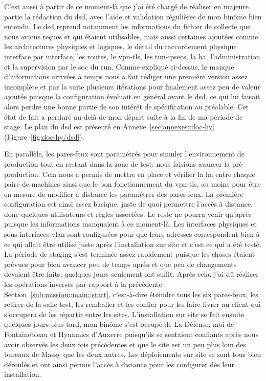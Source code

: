 \documentclass[12pt, oneside, a4paper, titlepage]{report}
\begin{document}
C'est aussi à partir de ce moment-là que j'ai été chargé de réaliser en majeure
partie la rédaction du \acrfull{dsd}, avec l'aide et validation régulières de
mon binôme bien entendu. Le \gls{dsd} reprend notamment les informations du
fichier de collecte que nous avions reçues et qui étaient utilisables, mais
aussi certaines ajoutées comme les architectures physiques et logiques, le
détail du raccordement physique interface par interface, les routes, le
\gls{vpn-tls}, les \glspl{tun-ipsec}, la \acrfull{ha}, l'administration et la
supervision par le \gls{soc} du \gls{run}. Comme expliqué ci-dessus, le manque
d'informations arrivées à temps nous a fait rédiger une première version assez
incomplète et par la suite plusieurs itérations pour finalement assez peu de
valeur ajoutée puisque la configuration évoluait en général avant le \gls{dsd},
ce qui lui faisait alors perdre une bonne partie de son intérêt de spécification
au préalable. Cet état de fait a perduré au-delà de mon départ suite à la fin de
ma période de stage. Le plan du \gls{dsd} est présenté en
Annexe~\ref{sec:annexes::doc-hy} (Figure~\ref{fig:doc-hy/dsd}).

En parallèle, les pares-feux sont paramétrés pour simuler l'environnement de
production tout en restant dans la zone de test: nous faisions avancer la
pré-production. Cela nous a permis de mettre en place et vérifier la \gls{ha}
entre chaque paire de machines ainsi que le bon fonctionnement du \gls{vpn-tls},
au moins pour être en mesure de modifier à distance les paramètres des
pares-feux. La première configuration est ainsi assez basique, juste de quoi
permettre l'accès à distance, donc quelques utilisateurs et règles associées. Le
reste ne pourra venir qu'après puisque les informations manquaient à ce
moment-là. Les interfaces physiques et sous-interfaces \gls{vlan} sont
configurées pour que leurs adresses correspondent bien à ce qui allait être
utilisé juste après l'installation sur site et c'est ce qui a été testé. La
période de \gls{staging} s'est terminée assez rapidement puisque les choses
étaient prévues pour bien avancer peu de temps après et que peu de changements
devaient être faits, quelques jours seulement ont suffit. Après cela, j'ai dû
réaliser les opérations inverses par rapport à la précédente
Section~\ref{sub:mission::main::start}, c'est-à-dire éteindre tous les six
pares-feux, les retirer de la salle test, les remballer et les confier pour les
faire livrer au client qui s'occupera de les répartir entre les sites.
L'installation sur site se fait ensuite quelques jours plus tard, mon binôme
s'est occupé de La Défense, moi de Fontainebleau et Hynamics d'Auxerre
puisqu'ils se sentaient confiants après nous avoir observés les deux fois
précédentes et que le site est un peu plus loin des bureaux de Massy que les
deux autres.  Les déploiements sur site se sont tous bien déroulés et ont ainsi
permis l'accès à distance pour les configurer dès leur installation.
\end{document}
